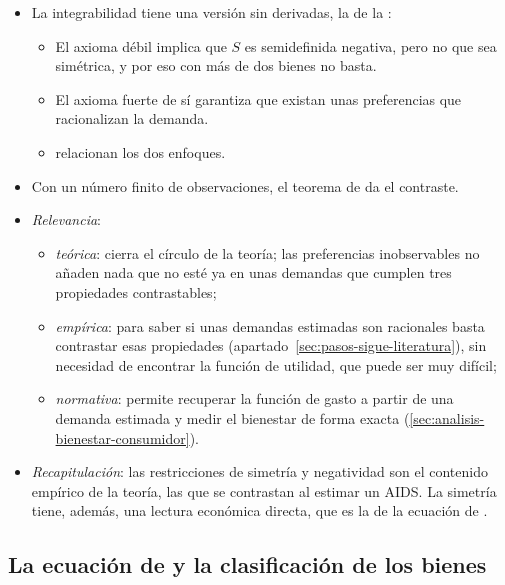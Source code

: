 \documentclass[11pt]{article}
\begin{document}
\begin{itemize}
\item La integrabilidad tiene una versión sin derivadas, la de la  :
  \begin{itemize}
  \item El axioma débil implica que $S$ es semidefinida negativa, pero no que sea simétrica, y por eso con más de dos bienes no basta.
  \item El axioma fuerte de \textcite{Houthakker1950Revealed} sí garantiza que existan unas preferencias que racionalizan la demanda.
  \item \textcite{KihlstromMasColellSonnenschein1976} relacionan los dos enfoques.
  \end{itemize}
\item Con un número finito de observaciones, el teorema de \textcite{Afriat1967Construction} da el contraste.
\item \emph{Relevancia}:
  \begin{itemize}
  \item \emph{teórica}: cierra el círculo de la teoría; las preferencias inobservables no añaden nada que no esté ya en unas demandas que cumplen tres propiedades contrastables;
  \item \emph{empírica}: para saber si unas demandas estimadas son racionales basta contrastar esas propiedades (apartado~\ref{sec:pasos-sigue-literatura}), sin necesidad de encontrar la función de utilidad, que puede ser muy difícil;
  \item \emph{normativa}: permite recuperar la función de gasto a partir de una demanda estimada y medir el bienestar de forma exacta\nocite{Hausman1981Exact} (\ref{sec:analisis-bienestar-consumidor}).
  \end{itemize}
\item \emph{Recapitulación}: las restricciones de simetría y negatividad son el contenido empírico de la teoría, las que se contrastan al estimar un AIDS. La simetría tiene, además, una lectura económica directa, que es la de la ecuación de .
\end{itemize}

\subsection{La ecuación de  y la clasificación de los bienes}\label{sec:ecuacion-slutsky-clasificacion}
\end{document}
